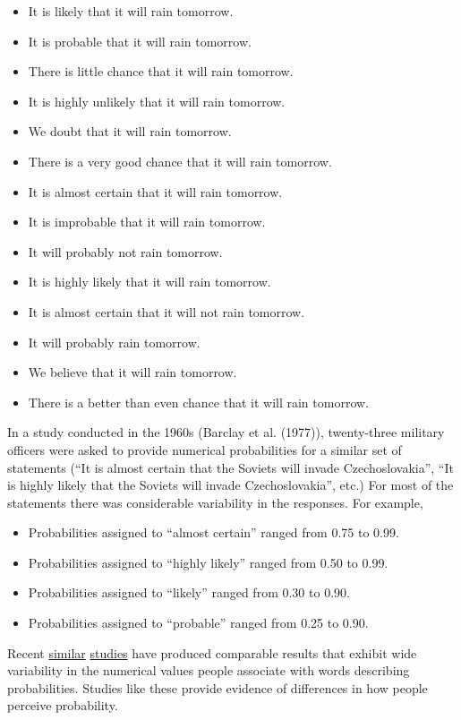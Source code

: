 \documentclass[
  letterpaper,
  DIV=11,
  numbers=noendperiod]{scrreprt}
\providecommand{\tightlist}{%
  \setlength{\itemsep}{0pt}\setlength{\parskip}{0pt}}
\theoremstyle{plain}
\theoremstyle{definition}
\theoremstyle{definition}
\theoremstyle{definition}
\theoremstyle{remark}
\begin{document}
\begin{itemize}
\tightlist
\item
  It is likely that it will rain tomorrow.
\item
  It is probable that it will rain tomorrow.
\item
  There is little chance that it will rain tomorrow.
\item
  It is highly unlikely that it will rain tomorrow.
\item
  We doubt that it will rain tomorrow.
\item
  There is a very good chance that it will rain tomorrow.
\item
  It is almost certain that it will rain tomorrow.
\item
  It is improbable that it will rain tomorrow.
\item
  It will probably not rain tomorrow.
\item
  It is highly likely that it will rain tomorrow.
\item
  It is almost certain that it will not rain tomorrow.
\item
  It will probably rain tomorrow.
\item
  We believe that it will rain tomorrow.
\item
  There is a better than even chance that it will rain tomorrow.
\end{itemize}

In a study conducted in the 1960s (Barclay et al. (1977)), twenty-three
military officers were asked to provide numerical probabilities for a
similar set of statements (``It is almost certain that the Soviets will
invade Czechoslovakia'', ``It is highly likely that the Soviets will
invade Czechoslovakia'', etc.) For most of the statements there was
considerable variability in the responses. For example,

\begin{itemize}
\tightlist
\item
  Probabilities assigned to ``almost certain'' ranged from 0.75 to 0.99.
\item
  Probabilities assigned to ``highly likely'' ranged from 0.50 to 0.99.
\item
  Probabilities assigned to ``likely'' ranged from 0.30 to 0.90.
\item
  Probabilities assigned to ``probable'' ranged from 0.25 to 0.90.
\end{itemize}

Recent
\href{https://mirkomazzoleni.github.io/blog/2016/12/17/perception_of_probability/}{similar}
\href{https://waf.cs.illinois.edu/visualizations/Perception-of-Probability-Words/}{studies}
have produced comparable results that exhibit wide variability in the
numerical values people associate with words describing probabilities.
Studies like these provide evidence of differences in how people
perceive probability.
\end{document}
